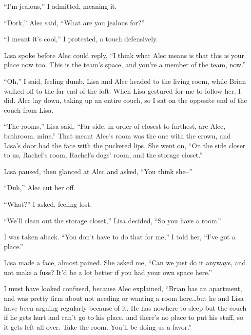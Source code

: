 ``I'm jealous,'' I admitted, meaning it.



``Dork,'' Alec said, ``What are you jealous for?''



``I meant it's cool,'' I protested, a touch defensively.



Lisa spoke before Alec could reply, ``I think what Alec means is that this is your place now too.  This is the team's space, and you're a member of the team, now.''



``Oh,'' I said, feeling dumb.  Lisa and Alec headed to the living room, while Brian walked off to the far end of the loft.  When Lisa gestured for me to follow her, I did.  Alec lay down, taking up an entire couch, so I sat on the opposite end of the couch from Lisa.



``The rooms,'' Lisa said, ``Far side, in order of closest to farthest, are Alec, bathroom, mine.''  That meant Alec's room was the one with the crown, and Lisa's door had the face with the puckered lips.  She went on, ``On the side closer to us, Rachel's room, Rachel's dogs' room, and the storage closet.''



Lisa paused, then glanced at Alec and asked, ``You think she--''



``Duh,'' Alec cut her off.



``What?'' I asked, feeling lost.



``We'll clean out the storage closet,'' Lisa decided, ``So you have a room.''



I was taken aback.  ``You don't have to do that for me,'' I told her, ``I've got a place.''



Lisa made a face, almost pained.  She asked me, ``Can we just do it anyways, and not make a fuss?  It'd be a lot better if you had your own space here.''



I must have looked confused, because Alec explained, ``Brian has an apartment, and was pretty firm about not needing or wanting a room here\ldots but he and Lisa have been arguing regularly because of it.  He has nowhere to sleep but the couch if he gets hurt and can't go to his place, and there's no place to put his stuff, so it gets left all over.  Take the room.  You'll be doing us a favor.''



